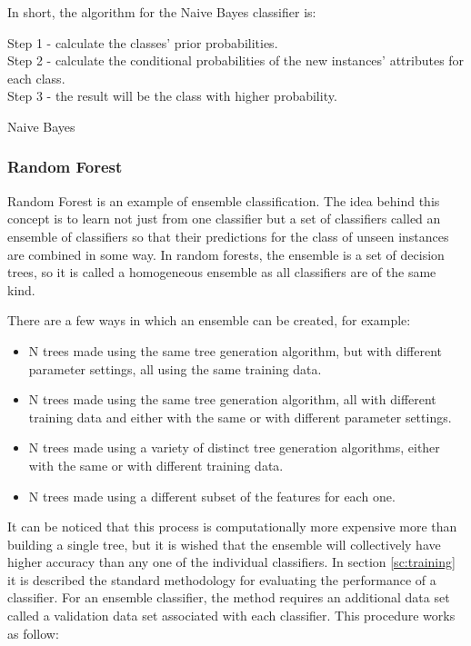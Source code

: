 In short, the algorithm for the Naive Bayes classifier is:

\begin{algorithm}[H]
Step 1 - calculate the classes' prior probabilities. \\
Step 2 - calculate the conditional probabilities of the new instances' attributes for each class. \\
Step 3 - the result will be the class with higher probability.
\caption{Naive Bayes}
\end{algorithm}

\subsubsection{Random Forest}

Random Forest is an example of ensemble classification. The idea behind this concept is to learn not just from one classifier but a set of classifiers  called an ensemble of classifiers so that their predictions for the class of unseen instances are combined in some way. In random forests, the ensemble is a set of decision trees, so it is called a homogeneous ensemble as all classifiers are of the same kind.

There are a few ways in which an ensemble can be created, for example:

\begin{itemize}
    \item N trees made using the same tree generation algorithm, but with different parameter settings, all using the same training data.
    \item N trees made using the same tree generation algorithm, all with different training data and either with the same or with different parameter settings.
    \item N trees made using a variety of distinct tree generation algorithms, either with the same or with different training data.
    \item N trees made using a different subset of the features for each one.
\end{itemize}

It can be noticed that this process is computationally more expensive more than building a single tree, but it is wished that the ensemble will collectively have higher accuracy than any one of the individual classifiers. In section \ref{sc:training} it is described the standard methodology for evaluating the performance of a classifier. For an ensemble classifier, the method requires an additional data set called a validation data set associated with each classifier. This procedure works as follow:

